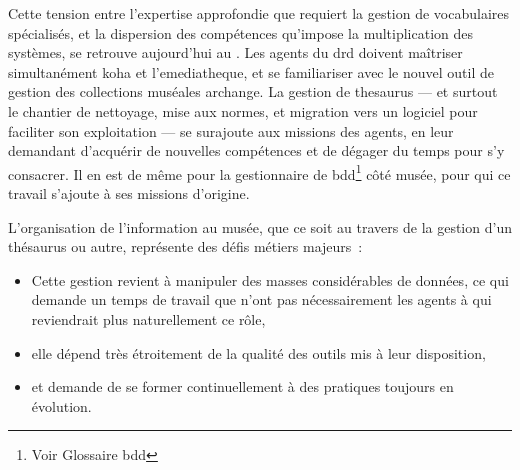 Cette tension entre l’expertise approfondie que requiert la gestion de vocabulaires spécialisés, et la dispersion des compétences qu’impose la multiplication des systèmes, se retrouve aujourd’hui au \mae. Les agents du \ac{drd} doivent maîtriser simultanément \gls{koha} et l’\gls{emediatheque}, et se familiariser avec le nouvel outil de gestion des collections muséales \gls{archange}. La gestion de \gls{thesaurus} — et surtout le chantier de nettoyage, mise aux normes, et migration vers un logiciel pour faciliter son exploitation — se surajoute aux missions des agents, en leur demandant d’acquérir de nouvelles compétences et de dégager du temps pour s’y consacrer. Il en est de même pour la gestionnaire de \gls{bdd}\footnote{Voir Glossaire \gls{bdd}} côté musée, pour qui ce travail s’ajoute à ses missions d’origine.

L’organisation de l’information au musée, que ce soit au travers de la gestion d’un thésaurus ou autre, représente des défis métiers majeurs~:
\begin{itemize}
	\item Cette gestion revient à manipuler des masses considérables de données, ce qui demande un temps de travail que n’ont pas nécessairement les agents à qui reviendrait plus naturellement ce rôle,
	\item elle dépend très étroitement de la qualité des outils mis à leur disposition,
	\item et demande de se former continuellement à des pratiques toujours en évolution.
\end{itemize}